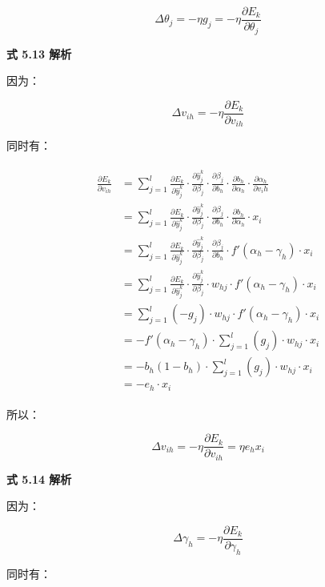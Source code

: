 \documentclass[../studies-ml.tex]{subfiles}
\begin{document}
\[
  \Delta \theta_j = -\eta g_j = -\eta \frac{\partial E_k}{\partial \theta_j}
\]

\textbf{式 5.13 解析}

因为：

\[
  \Delta v_{ih} = -\eta \frac{\partial E_k}{\partial v_{ih}}
\]

同时有：

\begin{align*}
  \begin{split}
    \frac{\partial E_k}{\partial v_{ih}} & = \sum_{j=1}^{l} \frac{\partial E_k}{\partial \hat{y}_j^k} \cdot
    \frac{\partial \hat{y}_j^k}{\partial \beta_j} \cdot \frac{\partial \beta_j}{\partial b_h} \cdot
    \frac{\partial b_h}{\partial \alpha_h} \cdot \frac{\partial \alpha_h}{\partial v_ih} \\
    & = \sum_{j=1}^{l} \frac{\partial E_k}{\partial \hat{y}_j^k} \cdot
    \frac{\partial \hat{y}_j^k}{\partial \beta_j} \cdot \frac{\partial \beta_j}{\partial b_h} \cdot
    \frac{\partial b_h}{\partial \alpha_h} \cdot x_i \\
    & = \sum_{j=1}^{l} \frac{\partial E_k}{\partial \hat{y}_j^k} \cdot
    \frac{\partial \hat{y}_j^k}{\partial \beta_j} \cdot \frac{\partial \beta_j}{\partial b_h} \cdot
    f'(\alpha_h - \gamma_h) \cdot x_i \\
    & = \sum_{j=1}^{l} \frac{\partial E_k}{\partial \hat{y}_j^k} \cdot
    \frac{\partial \hat{y}_j^k}{\partial \beta_j} \cdot w_{hj} \cdot f'(\alpha_h - \gamma_h) \cdot x_i \\
    & = \sum_{j=1}^{l} (-g_j) \cdot w_{hj} \cdot f'(\alpha_h - \gamma_h) \cdot x_i \\
    & = - f'(\alpha_h - \gamma_h) \cdot \sum_{j=1}^{l} (g_j) \cdot w_{hj} \cdot x_i \\
    & = - b_h (1 - b_h) \cdot \sum_{j=1}^{l} (g_j) \cdot w_{hj} \cdot x_i \\
    & = - e_h \cdot x_i
  \end{split}
\end{align*}

所以：

\[
  \Delta v_{ih} = -\eta \frac{\partial E_k}{\partial v_{ih}} = \eta e_h x_i
\]

\textbf{式 5.14 解析}

因为：

\[
  \Delta \gamma_h = -\eta \frac{\partial E_k}{\partial \gamma_h}
\]

同时有：
\end{document}
